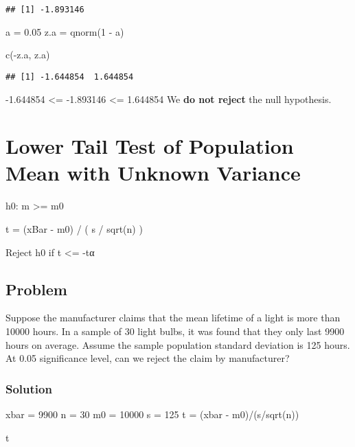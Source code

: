 \documentclass[
]{article}
\newenvironment{Shaded}{\begin{snugshade}}{\end{snugshade}}
\newcommand{\DecValTok}[1]{\textcolor[rgb]{0.00,0.00,0.81}{#1}}
\newcommand{\FloatTok}[1]{\textcolor[rgb]{0.00,0.00,0.81}{#1}}
\newcommand{\FunctionTok}[1]{\textcolor[rgb]{0.00,0.00,0.00}{#1}}
\newcommand{\NormalTok}[1]{#1}
\newcommand{\OtherTok}[1]{\textcolor[rgb]{0.56,0.35,0.01}{#1}}
\newcommand{\SpecialCharTok}[1]{\textcolor[rgb]{0.00,0.00,0.00}{#1}}
\begin{document}
\begin{verbatim}
## [1] -1.893146
\end{verbatim}

\begin{Shaded}
\begin{Highlighting}[]
\NormalTok{a }\OtherTok{=} \FloatTok{0.05} 
\NormalTok{z.a }\OtherTok{=} \FunctionTok{qnorm}\NormalTok{(}\DecValTok{1} \SpecialCharTok{{-}}\NormalTok{ a)}

\FunctionTok{c}\NormalTok{(}\SpecialCharTok{{-}}\NormalTok{z.a, z.a)}
\end{Highlighting}
\end{Shaded}

\begin{verbatim}
## [1] -1.644854  1.644854
\end{verbatim}

-1.644854 \textless= -1.893146 \textless= 1.644854 We \textbf{do not
reject} the null hypothesis.

\hypertarget{lower-tail-test-of-population-mean-with-unknown-variance}{%
\section{Lower Tail Test of Population Mean with Unknown
Variance}\label{lower-tail-test-of-population-mean-with-unknown-variance}}

h0: m \textgreater= m0

t = (xBar - m0) / ( s / sqrt(n) )

Reject h0 if t \textless= -tα

\hypertarget{problem-13}{%
\subsection{Problem}\label{problem-13}}

Suppose the manufacturer claims that the mean lifetime of a light is
more than 10000 hours. In a sample of 30 light bulbs, it was found that
they only last 9900 hours on average. Assume the sample population
standard deviation is 125 hours. At 0.05 significance level, can we
reject the claim by manufacturer?

\hypertarget{solution-15}{%
\subsubsection{Solution}\label{solution-15}}

\begin{Shaded}
\begin{Highlighting}[]
\NormalTok{xbar }\OtherTok{=} \DecValTok{9900}
\NormalTok{n }\OtherTok{=} \DecValTok{30}
\NormalTok{m0 }\OtherTok{=} \DecValTok{10000}
\NormalTok{s }\OtherTok{=} \DecValTok{125}
\NormalTok{t }\OtherTok{=}\NormalTok{ (xbar }\SpecialCharTok{{-}}\NormalTok{ m0)}\SpecialCharTok{/}\NormalTok{(s}\SpecialCharTok{/}\FunctionTok{sqrt}\NormalTok{(n))}

\NormalTok{t}
\end{Highlighting}
\end{Shaded}
\end{document}
